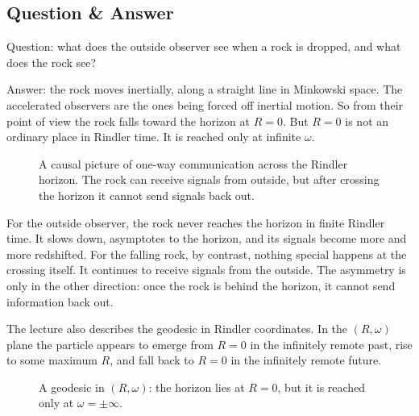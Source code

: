 \subsection{Question \& Answer}

Question: what does the outside observer see when a rock is dropped, and what does the rock see?

Answer: the rock moves inertially, along a straight line in Minkowski space. The accelerated observers are the ones being forced off inertial motion. So from their point of view the rock falls toward the horizon at \(R=0\). But \(R=0\) is not an ordinary place in Rindler time. It is reached only at infinite \(\omega\).

\begin{figure}[t]
\centering
{}
\caption{A causal picture of one-way communication across the Rindler horizon. The rock can receive signals from outside, but after crossing the horizon it cannot send signals back out.}
\end{figure}

For the outside observer, the rock never reaches the horizon in finite Rindler time. It slows down, asymptotes to the horizon, and its signals become more and more redshifted. For the falling rock, by contrast, nothing special happens at the crossing itself. It continues to receive signals from the outside. The asymmetry is only in the other direction: once the rock is behind the horizon, it cannot send information back out.

The lecture also describes the geodesic in Rindler coordinates. In the \((R,\omega)\) plane the particle appears to emerge from \(R=0\) in the infinitely remote past, rise to some maximum \(R\), and fall back to \(R=0\) in the infinitely remote future.

\begin{figure}[t]
\centering
{}
\caption{A geodesic in \((R,\omega)\): the horizon lies at \(R=0\), but it is reached only at \(\omega=\pm\infty\).}
\end{figure}

